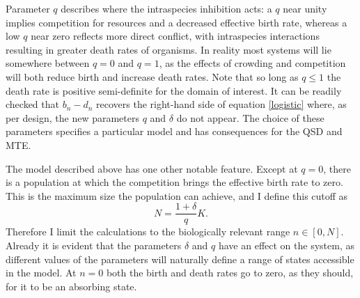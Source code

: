 Parameter $q$ describes where the intraspecies inhibition acts: a $q$ near unity implies competition for resources and a decreased effective birth rate, whereas a low $q$ near zero reflects more direct conflict, with intraspecies interactions resulting in greater death rates of organisms. 
In reality most systems will lie somewhere between $q=0$ and $q=1$, as the effects of crowding and competition will both reduce birth and increase death rates. 
Note that so long as $q\leq 1$ the death rate is positive semi-definite for the domain of interest. 
It can be readily checked that $b_n-d_n$ recovers the right-hand side of equation \ref{logistic} where, as per design, the new parameters $q$ and $\delta$ do not appear.
The choice of these parameters specifies a particular model and has consequences for the QSD and MTE. 

The model described above has one other notable feature. 
Except at $q=0$, there is a population at which the competition brings the effective birth rate to zero. 
This is the maximum size the population can achieve, and I define this cutoff as
\begin{equation}
N = \frac{1+\delta}{q}K. 
\label{maxN}
\end{equation}
Therefore I limit the calculations to the biologically relevant range $n\in[0,N]$. %
Already it is evident that the parameters $\delta$ and $q$ have an effect on the system, as different values of the parameters will naturally define a range of states accessible in the model. 
At $n=0$ both the birth and death rates go to zero, as they should, for it to be an absorbing state. %


